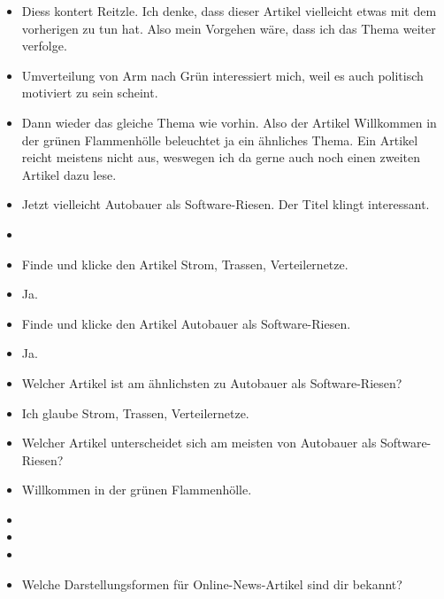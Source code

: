 {\begin{itemize}[]
                  Ich würde mich jetzt gerne informieren welchen Zwang das bedeutet und wer dahinter steckt.
            \item {} \flqq Diess kontert Reitzle\frqq{}. Ich denke, dass dieser Artikel vielleicht etwas mit dem vorherigen zu tun hat.
                  Also mein Vorgehen wäre, dass ich das Thema weiter verfolge.
            \item {} \flqq Umverteilung von Arm nach Grün\frqq{} interessiert mich, weil es auch politisch motiviert zu sein scheint.
            \item {} Dann wieder das gleiche Thema wie vorhin.
                  Also der Artikel \flqq Willkommen in der grünen Flammenhölle\frqq{} beleuchtet ja ein ähnliches Thema.
                  Ein Artikel reicht meistens nicht aus, weswegen ich da gerne auch noch einen zweiten Artikel dazu lese.
            \item {} Jetzt vielleicht \flqq Autobauer als Software-Riesen\frqq{}.
                  Der Titel klingt interessant.
            \item {}
            \item {} Finde und klicke den Artikel \flqq Strom, Trassen, Verteilernetze\frqq{}.
            \item {} Ja.
            \item {} Finde und klicke den Artikel \flqq Autobauer als Software-Riesen\frqq{}.
            \item {} Ja.
            \item {} Welcher Artikel ist am ähnlichsten zu \flqq Autobauer als Software-Riesen\frqq{}?
            \item {} Ich glaube \flqq Strom, Trassen, Verteilernetze\frqq{}.
            \item {} Welcher Artikel unterscheidet sich am meisten von \flqq Autobauer als Software-Riesen\frqq{}?
            \item {} \flqq Willkommen in der grünen Flammenhölle\frqq{}.
            \item {}
            \item {}
            \item {}
            \item {} Welche Darstellungsformen für Online-News-Artikel sind dir bekannt?

\end{itemize}}
